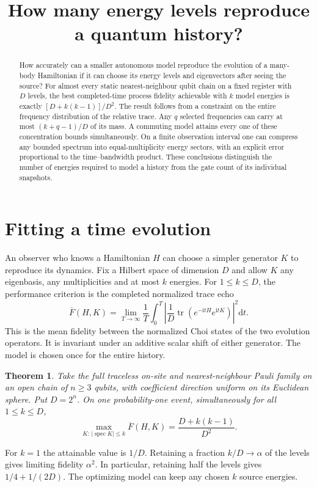 \documentclass[11pt]{article}
\title{How many energy levels reproduce a quantum history?}
\author{}
\date{}
\newtheorem{theorem}{Theorem}
\newcommand{\Tr}{\operatorname{tr}}
\newcommand{\ii}{\mathrm{i}}
\newcommand{\dd}{\mathrm{d}}
\begin{document}
\maketitle
\begin{abstract}
How accurately can a smaller autonomous model reproduce the evolution of a many-body Hamiltonian if it can choose its energy levels and eigenvectors after seeing the source? For almost every static nearest-neighbour qubit chain on a fixed register with $D$ levels, the best completed-time process fidelity achievable with $k$ model energies is exactly $[D+k(k-1)]/D^2$. The result follows from a constraint on the entire frequency distribution of the relative trace. Any $q$ selected frequencies can carry at most $(k+q-1)/D$ of its mass. A commuting model attains every one of these concentration bounds simultaneously. On a finite observation interval one can compress any bounded spectrum into equal-multiplicity energy sectors, with an explicit error proportional to the time--bandwidth product. These conclusions distinguish the number of energies required to model a history from the gate count of its individual snapshots.
\end{abstract}

\section{Fitting a time evolution}
An observer who knows a Hamiltonian $H$ can choose a simpler generator $K$ to reproduce its dynamics. Fix a Hilbert space of dimension $D$ and allow $K$ any eigenbasis, any multiplicities and at most $k$ energies. For $1\le k\le D$, the performance criterion is the completed normalized trace echo
\[
 \overline{F}(H,K)=\lim_{T\to\infty}\frac1T\int_0^T
      \left|\frac{1}{D}\Tr(e^{-\ii tH}e^{\ii tK})\right|^2\dd t .
\]
This is the mean fidelity between the normalized Choi states of the two evolution operators. It is invariant under an additive scalar shift of either generator. The model is chosen once for the entire history.

\begin{theorem}\label{main}
Take the full traceless on-site and nearest-neighbour Pauli family on an open chain of $n\ge3$ qubits, with coefficient direction uniform on its Euclidean sphere. Put $D=2^n$. On one probability-one event, simultaneously for all $1\le k\le D$,
\[
             \max_{K:\,|\operatorname{spec} K|\le k}\overline{F}(H,K)
                    = \frac{D+k(k-1)}{D^2}.
\]
\end{theorem}
For $k=1$ the attainable value is $1/D$. Retaining a fraction $k/D\to\alpha$ of the levels gives limiting fidelity $\alpha^2$. In particular, retaining half the levels gives $1/4+1/(2D)$. The optimizing model can keep any chosen $k$ source energies.
\end{document}
